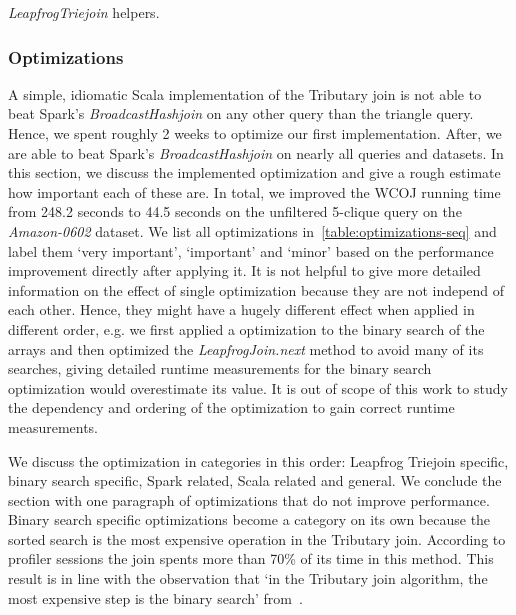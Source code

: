 \begin{listing}[H]
    \inputminted{scala}{code/LeapfrogTriejoinHelpers.scala}
    \caption{\textit{LeapfrogTriejoin} helpers.}
    \label{lst:leapfrog-triejoin-helpers}
\end{listing}

\subsubsection{Optimizations}
A simple, idiomatic Scala implementation of the Tributary join is not able to beat Spark's \textit{BroadcastHashjoin} on any other query than the triangle query.
Hence, we spent roughly 2 weeks to optimize our first implementation.
After, we are able to beat Spark's \textit{BroadcastHashjoin} on nearly all queries and datasets.
In this section, we discuss the implemented optimization and give a rough estimate how important each of these are.
In total, we improved the WCOJ running time from 248.2 seconds to 44.5 seconds on the unfiltered 5-clique query on the
\textit{Amazon-0602} dataset.
We list all optimizations in~\cref{table:optimizations-seq} and label them `very important', `important' and `minor' based on the performance improvement directly after applying it.
It is not helpful to give more detailed information on the effect of single optimization because they are not independ of each other.
Hence, they might have a hugely different effect when applied in different order, e.g. we first applied a optimization to the binary search of the arrays and then
optimized the \textit{LeapfrogJoin.next} method to avoid many of its searches, giving detailed runtime measurements for the binary search optimization would
overestimate its value.
It is out of scope of this work to study the dependency and ordering of the optimization to gain correct runtime measurements.

We discuss the optimization in categories in this order: Leapfrog Triejoin specific, binary search specific, Spark related, Scala related and general.
We conclude the section with one paragraph of optimizations that do not improve performance.
Binary search specific optimizations become a category on its own because the sorted search is the most expensive operation in the Tributary join.
According to profiler sessions the join spents more than 70\% of its time in this method. %
This result is in line with the observation that `in the Tributary join algorithm, the most expensive step is the binary search' from~\cite{myria-detailed}.

